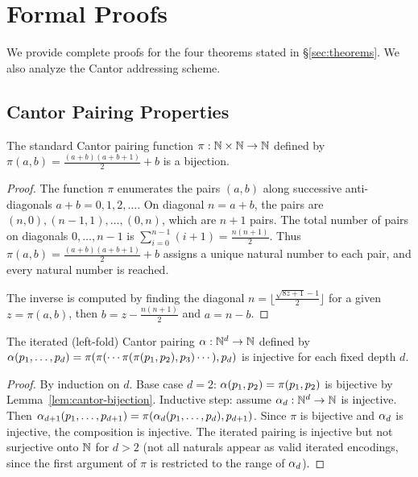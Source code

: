 
\section{Formal Proofs}
\label{sec:proofs}

We provide complete proofs for the four theorems stated in
\S\ref{sec:theorems}.  We also analyze the Cantor addressing scheme.

\subsection{Cantor Pairing Properties}
\label{sec:cantor-analysis}

\begin{lemma}
\label{lem:cantor-bijection}
The standard Cantor pairing function
$\pi: \mathbb{N} \times \mathbb{N} \to \mathbb{N}$ defined by
$\pi(a, b) = \frac{(a+b)(a+b+1)}{2} + b$
is a bijection.
\end{lemma}

\begin{proof}
The function $\pi$ enumerates the pairs $(a,b)$ along successive
anti-diagonals $a+b = 0, 1, 2, \dots$.  On diagonal $n = a+b$,
the pairs are $(n,0), (n{-}1,1), \dots, (0,n)$, which are $n+1$
pairs.  The total number of pairs on diagonals $0, \dots, n{-}1$ is
$\sum_{i=0}^{n-1}(i+1) = \frac{n(n+1)}{2}$.  Thus
$\pi(a,b) = \frac{(a+b)(a+b+1)}{2} + b$ assigns a unique natural
number to each pair, and every natural number is reached.

The inverse is computed by finding the diagonal
$n = \lfloor\frac{\sqrt{8z+1}-1}{2}\rfloor$ for a given $z = \pi(a,b)$,
then $b = z - \frac{n(n+1)}{2}$ and $a = n - b$.
\end{proof}

\begin{lemma}
\label{lem:iterated-cantor}
The iterated (left-fold) Cantor pairing
$\alpha: \mathbb{N}^d \to \mathbb{N}$ defined by
$\alpha(p_1, \dots, p_d) = \pi(\pi(\cdots\pi(\pi(p_1, p_2), p_3)\cdots), p_d)$
is injective for each fixed depth $d$.
\end{lemma}

\begin{proof}
By induction on $d$.  Base case $d=2$: $\alpha(p_1, p_2) = \pi(p_1, p_2)$
is bijective by Lemma~\ref{lem:cantor-bijection}.  Inductive step:
assume $\alpha_d: \mathbb{N}^d \to \mathbb{N}$ is injective.  Then
$\alpha_{d+1}(p_1, \dots, p_{d+1}) = \pi(\alpha_d(p_1, \dots, p_d), p_{d+1})$.
Since $\pi$ is bijective and $\alpha_d$ is injective, the composition
is injective.  The iterated pairing is injective but not surjective
onto $\mathbb{N}$ for $d>2$ (not all naturals appear as valid iterated
encodings, since the first argument of $\pi$ is restricted to the
range of $\alpha_d$).
\end{proof}

